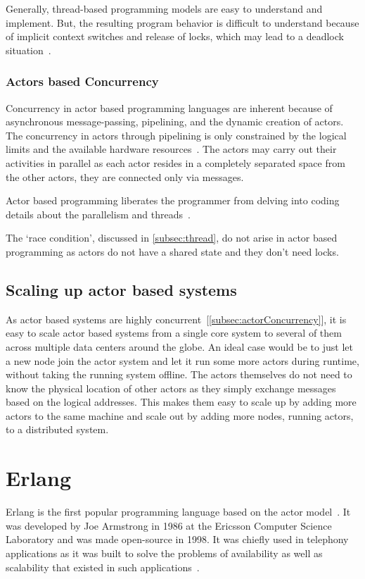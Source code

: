   Generally, thread-based programming models are easy to understand and implement. But, the resulting program behavior is difficult to understand because of implicit context switches and release of locks, which may lead to a deadlock situation~\cite{ambientTalk}.

\subsubsection{Actors based Concurrency}
\label{subsec:actorConcurrency}
  Concurrency in actor based programming languages are inherent because of asynchronous message-passing, pipelining, and the dynamic creation of actors. The concurrency in actors through pipelining is only constrained by the logical limits and the available hardware resources~\cite{agha}. The actors may carry out their activities in parallel as each actor resides in a completely separated space from the other actors, they are connected only via messages.

  Actor based programming liberates the programmer from delving into coding details about the parallelism and threads~\cite{agha}.

The ‘race condition’, discussed in \autoref{subsec:thread}, do not arise in actor based programming as actors do not have a shared state and they don't need locks.

\subsection{Scaling up actor based systems}
  As actor based systems are highly concurrent~[\autoref{subsec:actorConcurrency}], it is easy to scale actor based systems from a single core system to several of them across multiple data centers around the globe. An ideal case would be to just let a new node join the actor system and let it run some more actors during runtime, without taking the running system offline. The actors themselves do not need to know the physical location of other actors as they simply exchange messages based on the logical addresses. This makes them easy to scale up by adding more actors to the same machine and scale out by adding more nodes, running actors, to a distributed system.

\section{Erlang}
\label{sec:erlang}
  Erlang is the first popular programming language based on the actor model~\cite{vinoski}. It was developed by Joe Armstrong in 1986 at the Ericsson Computer Science Laboratory and was made open-source in 1998. It was chiefly used in telephony applications as it was built to solve the problems of availability as well as scalability that existed in such applications~\cite{armstrong}.

